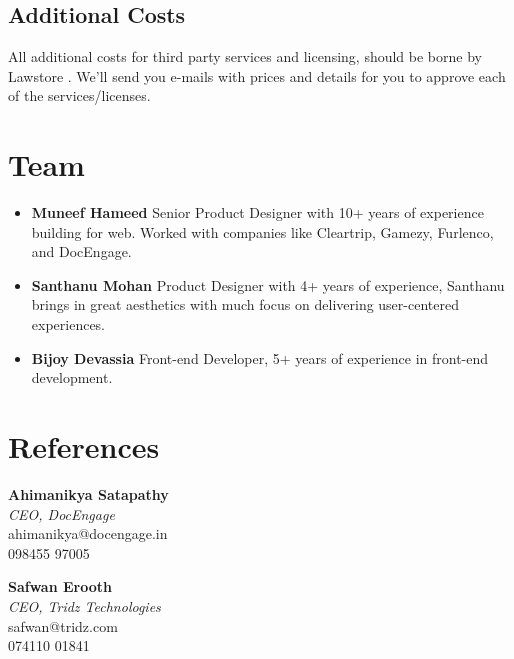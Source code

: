 \documentclass[a4paper,10pt]{article}
\newcommand{\newCommandCompanyName}{Lawstore }
\begin{document}
		\subsection{Additional Costs}
		
		All additional costs for third party services and licensing, should be borne by \newCommandCompanyName. We’ll send you e-mails with prices and details for you to approve each of the services/licenses.\\
		
		\section{Team}
		
		\begin{itemize}
			\item
			\textbf{Muneef Hameed} \newline
			Senior Product Designer with 10+ years of experience
			building for web. Worked with companies like Cleartrip, Gamezy,
			Furlenco, and DocEngage.
			\item
			\textbf{Santhanu Mohan}  \newline Product Designer with 4+ years of experience,  Santhanu brings in great aesthetics with much focus on delivering user-centered experiences.
			\item
			\textbf{Bijoy Devassia}  \newline Front-end Developer, 5+ years of experience in front-end development.
		\end{itemize}
		
		
		\section{References}
		
		\begin{multicols}{2}
			\noindent
			\textbf{Ahimanikya Satapathy} \\
			\textit{CEO, DocEngage} \\
			ahimanikya@docengage.in \\
			098455 97005\newline			
			
			\noindent
			\textbf{Safwan Erooth} \\
			\textit{CEO, Tridz Technologies} \\
			safwan@tridz.com \\
			074110 01841 \\
		\end{multicols}
		
\end{document}
